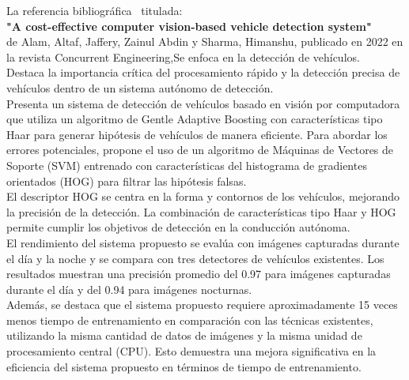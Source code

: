 \documentclass[10pt,letterpaper,final]{article}
\begin{document}
\begin{longtable}
        \hline
        \noindent La referencia bibliográfica~\cite{alam2022cost} titulada:                                                        \\
        \textbf{"A cost-effective computer vision-based vehicle detection system"}                                                                                               \\
        de Alam, Altaf, Jaffery, Zainul Abdin y Sharma, Himanshu, publicado en 2022 en la revista Concurrent Engineering,Se enfoca en la detección de vehículos.
        \\Destaca la importancia crítica del procesamiento rápido y la detección precisa de vehículos dentro de un sistema autónomo de detección.
        \\Presenta un sistema de detección de vehículos basado en visión por computadora que utiliza un algoritmo de Gentle Adaptive Boosting
        con características tipo Haar para generar hipótesis de vehículos de manera eficiente.
        Para abordar los errores potenciales, propone el uso de un algoritmo de Máquinas de Vectores de Soporte (SVM) entrenado con características
        del histograma de gradientes orientados (HOG) para filtrar las hipótesis falsas.
        \\El descriptor HOG se centra en la forma y contornos de los vehículos, mejorando la precisión de la detección.
        La combinación de características tipo Haar y HOG permite cumplir los objetivos de detección en la conducción autónoma.
        \\El rendimiento del sistema propuesto se evalúa con imágenes capturadas durante el día y la noche y se compara con tres detectores
        de vehículos existentes. Los resultados muestran una precisión promedio del 0.97 para imágenes capturadas durante el día
        y del 0.94 para imágenes nocturnas.                                                                                               \\Además, se destaca que el sistema propuesto requiere aproximadamente 15 veces menos tiempo
        de entrenamiento en comparación con las técnicas existentes, utilizando la misma cantidad de datos de imágenes y la misma unidad
        de procesamiento central (CPU). Esto demuestra una mejora significativa en la eficiencia del sistema propuesto en términos de tiempo de entrenamiento.
        \begin{figure}[!ht]

\end{figure}
\end{longtable}
\end{document}
